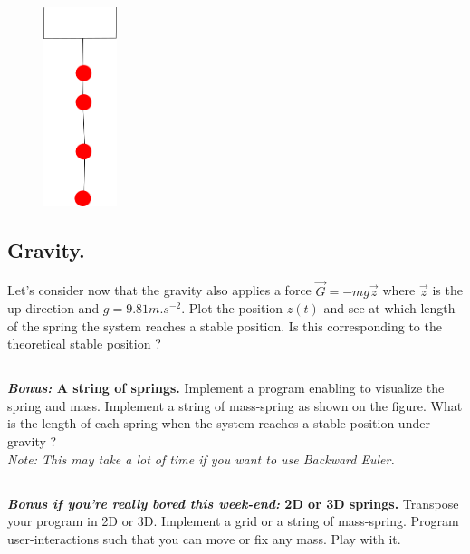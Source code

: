 \begin{figure}
  \centering
  \vspace{-0.5cm}
\includegraphics[width=0.19\textwidth]{springs.png}
\vspace{-1cm}
\end{figure}


\subsection{Gravity.} Let's consider now that the gravity also applies a force $\vec{G} = - m g \vec{z}$ where $\vec{z}$ is the up direction and $g = 9.81m.s^{-2}$. Plot the position $z(t)$ and see at which length of the spring the system reaches a stable position. Is this corresponding to the theoretical stable position ?

\subsection{} \textbf{\emph{Bonus:} A string of springs.} Implement a program enabling to visualize the spring and mass. Implement a string of mass-spring as shown on the figure. What is the length of each spring when the system reaches a stable position under gravity ?\\
\emph{Note: This may take a lot of time if you want to use Backward Euler.}
%

\subsection{} \textbf{\emph{Bonus if you're really bored this week-end:} 2D or 3D springs.} Transpose your program in 2D or 3D. Implement a grid or a string of mass-spring. Program user-interactions such that you can move or fix any mass. Play with it.
